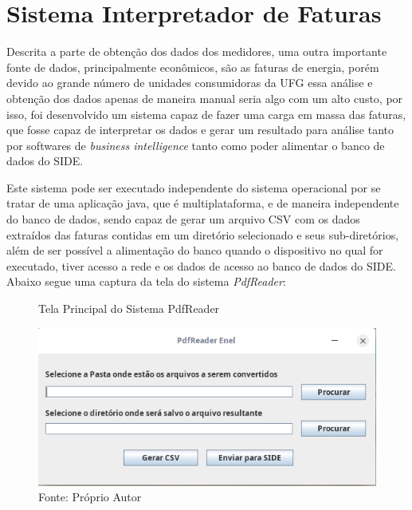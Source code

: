\chapter{Sistema Interpretador de Faturas} 
\label{c:sistema_interpretador_de_faturas}
Descrita a parte de obtenção dos dados dos medidores, uma outra importante fonte de dados, principalmente econômicos, são as faturas de energia, porém devido ao grande número de unidades consumidoras da UFG essa análise e obtenção dos dados apenas de maneira manual seria algo com um alto custo, por isso, foi desenvolvido um sistema capaz de fazer uma carga em massa das faturas, que fosse capaz de interpretar os dados e gerar um resultado para análise tanto por softwares de \textit{business intelligence} tanto como poder alimentar o banco de dados do SIDE.

Este sistema pode ser executado independente do sistema operacional por se tratar de uma aplicação java, que é multiplataforma, e de maneira independente do banco de dados, sendo capaz de gerar um arquivo CSV com os dados extraídos das faturas contidas em um diretório selecionado e seus sub-diretórios, além de ser possível a alimentação do banco quando o dispositivo no qual for executado, tiver acesso a rede e os dados de acesso ao banco de dados do SIDE. Abaixo segue uma captura da tela do sistema \textit{PdfReader}:

\begin{figure}[H]
    \centering
    \caption{Tela Principal do Sistema PdfReader}
\includegraphics[width=\linewidth]{imagens/pdf-reader.png}
    \caption*{Fonte: Próprio Autor}
    \label{fig:diagrama-modelo-dados}
\end{figure}